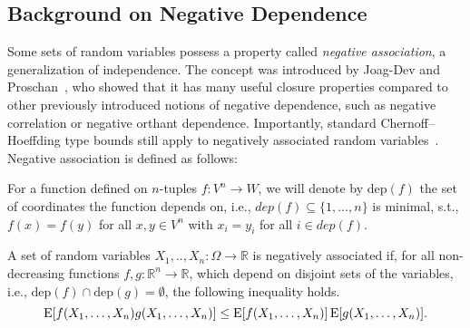\subsection{Background on Negative Dependence}
Some sets of random variables possess a property called \emph{negative association}, a generalization of independence.
The concept was introduced by Joag-Dev and Proschan~\cite{joagdev1983}, who showed that it has many useful closure properties compared to other previously introduced notions of negative dependence, such as negative correlation or negative orthant dependence.
Importantly, standard Chernoff--Hoeffding type bounds still apply to negatively associated random variables~\cite[Prop. 7]{dubhashi1998}.
Negative association is defined as follows:
\begin{definition}
For a function defined on $n$-tuples $f: V^n \rightarrow W$, we will denote by $\mathrm{dep}(f)$ the set of coordinates the function depends on, i.e., $dep(f) \subseteq \{1,\ldots,n\}$ is minimal, s.t., $f(x) = f(y)$ for all $x, y \in V^n$ with $x_i = y_i$ for all $i \in dep(f)$.
\end{definition}

\begin{definition}\label{def:neg_assoc}
A set of random variables $X_1,..,X_n: \Omega \rightarrow \mathbb R$ is negatively associated if, for all non-decreasing functions $f,g: \mathbb R^n \rightarrow \mathbb R$, which depend on disjoint sets of the variables, i.e., $\mathrm{dep}(f) \cap \mathrm{dep}(g) = \emptyset$, the following inequality holds.
\[
\operatorname{\mathrm{E}} [f(X_1,\ldots,X_n) g(X_1,\ldots,X_n)] \leq \operatorname{\mathrm{E}} [f(X_1,\ldots,X_n)] \operatorname{\mathrm{E}} [g(X_1,\ldots,X_n)] \textrm{.}
\]
\end{definition}

